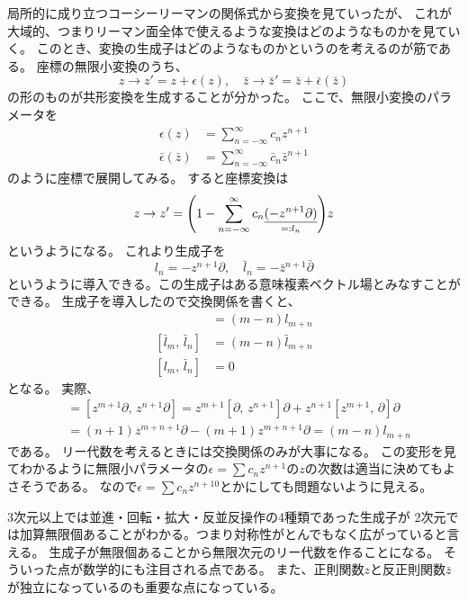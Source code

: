 \documentclass[../../master.tex]{subfiles}
\begin{document}
局所的に成り立つコーシーリーマンの関係式から変換を見ていったが、
これが大域的、つまりリーマン面全体で使えるような変換はどのようなものかを見ていく。
このとき、変換の生成子はどのようなものかというのを考えるのが筋である。
座標の無限小変換のうち、
\begin{equation}
    z \rightarrow z' = z + \epsilon(z),\quad \bar{z} \rightarrow \bar{z}' = \bar{z} + \bar{\epsilon}(\bar{z})
\end{equation}
の形のものが共形変換を生成することが分かった。
ここで、無限小変換のパラメータを
\begin{align}
    \epsilon(z) &= \sum_{n=-\infty}^{\infty}c_n z^{n+1}\\
    \bar{\epsilon}(\bar{z}) &= \sum_{n=-\infty}^{\infty}\bar{c}_n \bar{z}^{n+1}
\end{align}
のように座標で展開してみる。
すると座標変換は
\begin{equation*}
    z \rightarrow z' = \qty(1 - \sum_{n=-\infty}^{\infty}c_n \underset{=:l_n}{\underline{(-z^{n+1}\partial)}} )z
\end{equation*}
というようになる。
これより生成子を
\begin{equation}
    l_n =  -z^{n+1}\partial,\quad \bar{l}_n = -\bar{z}^{n+1}\bar{\partial}
\end{equation}
というように導入できる。この生成子はある意味複素ベクトル場とみなすことができる。
生成子を導入したので交換関係を書くと、
\begin{align}
    [l_m,\,l_n] &= (m-n)l_{m+n}\\
    [\bar{l}_m,\,\bar{l}_n] &= (m-n) \bar{l}_{m+n}\\
    [l_m,\,\bar{l}_n] &= 0
\end{align}
となる。
実際、
\begin{align*}
    [l_m,\,l_n] &= [z^{m+1}\partial,\,z^{n+1}\partial] = z^{m+1}[\partial,\,z^{n+1}]\partial + z^{n+1}[z^{m+1},\,\partial]\partial\\
    &=(n+1)z^{m+n+1}\partial -(m+1)z^{m+n+1}\partial = (m-n)l_{m+n}
\end{align*}
である。
リー代数を考えるときには交換関係のみが大事になる。
この変形を見てわかるように無限小パラメータの\(\epsilon=\sum c_n z^{n+1}\)の\(z\)の次数は適当に決めてもよさそうである。
なので\(\epsilon= \sum c_n z^{n+10}\)とかにしても問題ないように見える。

3次元以上では並進・回転・拡大・反並反操作の4種類であった生成子が
2次元では加算無限個あることがわかる。つまり対称性がとんでもなく広がっていると言える。
生成子が無限個あることから無限次元のリー代数を作ることになる。
そういった点が数学的にも注目される点である。
また、正則関数\(z\)と反正則関数\(\bar{z}\)が独立になっているのも重要な点になっている。
\end{document}
